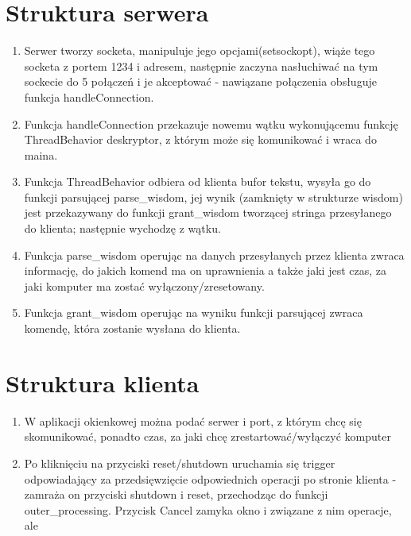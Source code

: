 \documentclass[12pt]{article}
\begin{document}
\section{Struktura serwera}
\begin {enumerate}
	\item Serwer tworzy socketa, manipuluje jego opcjami(setsockopt), wiąże tego socketa z portem 1234 i adresem, następnie zaczyna nasłuchiwać na tym sockecie do 5 połączeń i je akceptować - nawiązane połączenia obsługuje funkcja handleConnection.
	\item Funkcja handleConnection przekazuje nowemu wątku wykonującemu funkcję ThreadBehavior deskryptor, z którym może się komunikować i wraca do maina.
	\item Funkcja ThreadBehavior odbiera od klienta bufor tekstu, wysyła go do funkcji parsującej parse\_wisdom, jej wynik (zamknięty w strukturze wisdom) jest przekazywany do funkcji grant\_wisdom tworzącej stringa przesyłanego do klienta; następnie wychodzę z wątku.
	\item Funkcja parse\_wisdom operując na danych przesyłanych przez klienta zwraca informację, do jakich komend ma on uprawnienia a także jaki jest czas, za jaki komputer ma zostać wyłączony/zresetowany.
	\item Funkcja grant\_wisdom operując na wyniku funkcji parsującej zwraca komendę, która zostanie wysłana do klienta.

\end {enumerate}
\section{Struktura klienta}
\begin{enumerate}
	\item W aplikacji okienkowej można podać serwer i port, z którym chcę się skomunikować, ponadto czas, za jaki chcę zrestartować/wyłączyć komputer
	\item Po kliknięciu na przyciski reset/shutdown uruchamia się trigger odpowiadający za przedsięwzięcie odpowiednich operacji po stronie klienta - zamraża on przyciski shutdown i reset, przechodząc do funkcji outer\_processing. Przycisk Cancel zamyka okno i związane z nim operacje, ale 
\end{enumerate}
\end{document}
